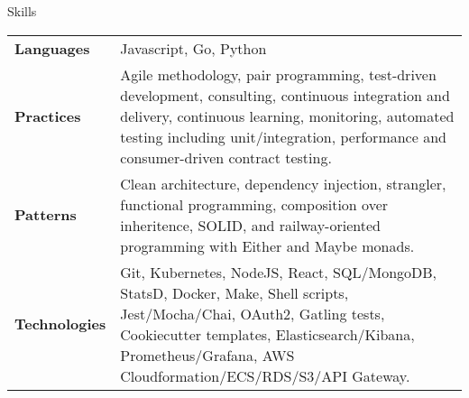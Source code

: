\begin{section}{Skills}
  \begin{tabularx}{\linewidth}{@{}l X@{}}
    \textbf{Languages} &\small{Javascript, Go, Python} \\
    \textbf{Practices} &\small{Agile methodology, pair programming, test-driven development, consulting, continuous integration and delivery, continuous learning, monitoring, automated testing including unit/integration, performance and consumer-driven contract testing.} \\
    \textbf{Patterns} &\small{Clean architecture, dependency injection, strangler, functional programming, composition over inheritence, SOLID, and railway-oriented programming with Either and Maybe monads.} \\
    \textbf{Technologies} &\small{Git, Kubernetes, NodeJS, React, SQL/MongoDB, StatsD, Docker, Make, Shell scripts, Jest/Mocha/Chai, OAuth2, Gatling tests, Cookiecutter templates, Elasticsearch/Kibana, Prometheus/Grafana, AWS Cloudformation/ECS/RDS/S3/API Gateway.} \\ 
  \end{tabularx}
\end{section}
